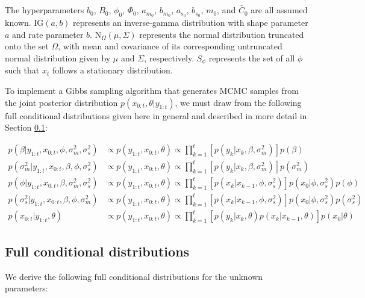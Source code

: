 \documentclass{article}
\begin{document}
\noindent The hyperparameters $b_0$, $B_0$, $\phi_0$, $\Phi_0$, $a_{m_0}$, $b_{m_0}$, $a_{s_0}$, $b_{s_0}$, $m_0$, and $\tilde{C_0}$ are all assumed known. $\mbox{IG}(a,b)$ represents an inverse-gamma distribution with shape parameter $a$ and rate parameter $b$. $\mbox{N}_{\Omega}(\mu, \Sigma)$ represents the normal distribution truncated onto the set $\Omega$, with mean and covariance of its corresponding untruncated normal distribution given by $\mu$ and $\Sigma$, respectively. $S_{\phi}$ represents the set of all $\phi$ such that $x_t$ follows a stationary distribution.

To implement a Gibbs sampling algorithm that generates MCMC samples from the joint posterior distribution $p(x_{0:t},\theta|y_{1:t})$, we must draw from the following full conditional distributions given here in general and described in more detail in Section  \ref{sec:fullcond}:

\begin{align*}
p(\beta|y_{1:t},x_{0:t},\phi,\sigma^2_m,\sigma^2_s) &\propto p(y_{1:t},x_{0:t},\theta) \propto \prod_{k=1}^t\left[p(y_k|x_k,\beta,\sigma^2_m)\right]p(\beta) \\
p(\sigma^2_m|y_{1:t},x_{0:t},\beta,\phi,\sigma^2_s) &\propto p(y_{1:t},x_{0:t},\theta) \propto \prod_{k=1}^t\left[p(y_k|x_k,\beta,\sigma^2_m)\right]p(\sigma^2_m) \\
p(\phi|y_{1:t},x_{0:t},\beta,\sigma^2_m,\sigma^2_s) &\propto p(y_{1:t},x_{0:t},\theta) \propto \prod_{k=1}^t\left[p(x_k|x_{k-1},\phi,\sigma^2_s)\right]p(x_0|\phi,\sigma^2_s)p(\phi) \\
p(\sigma^2_s|y_{1:t},x_{0:t},\beta,\phi,\sigma^2_m) &\propto p(y_{1:t},x_{0:t},\theta) \propto \prod_{k=1}^t\left[p(x_k|x_{k-1},\phi,\sigma^2_s)\right]p(x_0|\phi,\sigma^2_s)p(\sigma^2_s) \\
p(x_{0:t}|y_{1:t},\theta) &\propto p(y_{1:t},x_{0:t},\theta) \propto \prod_{k=1}^t\left[p(y_k|x_k,\theta)p(x_k|x_{k-1},\theta)\right]p(x_0|\theta)
\end{align*}

\subsection{Full conditional distributions} \label{sec:fullcond}

We derive the following full conditional distributions for the unknown parameters:
\end{document}

